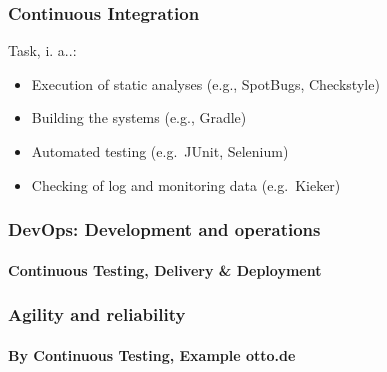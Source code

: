 
\begin{frame}
\frametitle{Continuous Integration}
Task, i. a..:
\begin{itemize}
	\item Execution of static analyses (e.g., SpotBugs, Checkstyle)
	\item Building the systems (e.g., Gradle)
	\item Automated testing (e.g.\ JUnit, Selenium) %
	\item Checking of log and monitoring data (e.g.\ Kieker) %
\end{itemize}
\end{frame}


\begin{frame}
\frametitle{DevOps: Development and operations}
\framesubtitle{Continuous Testing, Delivery \& Deployment}
\begin{center}
\end{center}
\end{frame}


\begin{frame}
\frametitle{Agility and reliability}
\framesubtitle{By Continuous Testing, Example otto.de}%
\begin{center}
\end{center}
\end{frame}
